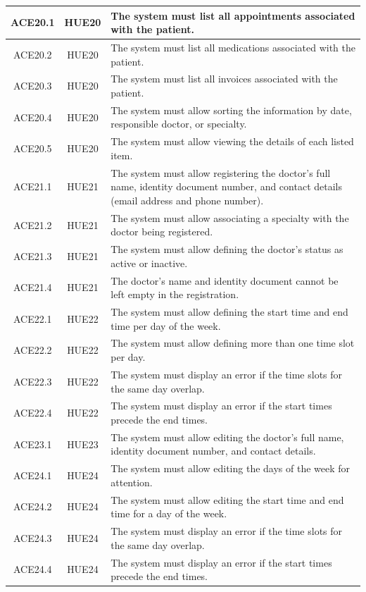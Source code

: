 \documentclass{prgrado}
\begin{document}
\begin{longtable}{|c|c|p{9cm}|}
ACE20.1 & HUE20 & The system must list all appointments associated with the patient. \\ \hline
ACE20.2 & HUE20 & The system must list all medications associated with the patient. \\ \hline
ACE20.3 & HUE20 & The system must list all invoices associated with the patient. \\ \hline
ACE20.4 & HUE20 & The system must allow sorting the information by date, responsible doctor, or specialty. \\ \hline
ACE20.5 & HUE20 & The system must allow viewing the details of each listed item. \\ \hline
ACE21.1 & HUE21 & The system must allow registering the doctor's full name, identity document number, and contact details (email address and phone number). \\ \hline
ACE21.2 & HUE21 & The system must allow associating a specialty with the doctor being registered. \\ \hline
ACE21.3 & HUE21 & The system must allow defining the doctor's status as active or inactive. \\ \hline
ACE21.4 & HUE21 & The doctor's name and identity document cannot be left empty in the registration. \\ \hline

ACE22.1 & HUE22 & The system must allow defining the start time and end time per day of the week. \\ \hline
ACE22.2 & HUE22 & The system must allow defining more than one time slot per day. \\ \hline
ACE22.3 & HUE22 & The system must display an error if the time slots for the same day overlap. \\ \hline
ACE22.4 & HUE22 & The system must display an error if the start times precede the end times. \\ \hline

ACE23.1 & HUE23 & The system must allow editing the doctor's full name, identity document number, and contact details. \\ \hline

ACE24.1 & HUE24 & The system must allow editing the days of the week for attention. \\ \hline
ACE24.2 & HUE24 & The system must allow editing the start time and end time for a day of the week. \\ \hline
ACE24.3 & HUE24 & The system must display an error if the time slots for the same day overlap. \\ \hline
ACE24.4 & HUE24 & The system must display an error if the start times precede the end times. \\ \hline


\end{longtable}
\end{document}
